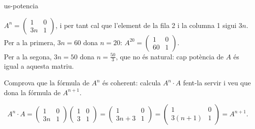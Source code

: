 \begin{apartats}
\begin{tria}{us-potencia}
\begin{solucio}
$A^n=\begin{pmatrix}1&0\\3n&1\end{pmatrix}$, i per tant cal que l'element de la fila 2 i la columna 1
sigui $3n$.\\
Per a la primera, $3n=60$ dona $n=20$: $A^{20}=\begin{pmatrix}1&0\\60&1\end{pmatrix}$.\\
Per a la segona, $3n=50$ dona $n=\frac{50}3$, que no és natural: cap potència de $A$ és igual a
aquesta matriu.
\end{solucio}
\end{tria}

\begin{nomesllarg}
Comprova que la fórmula de $A^n$ és coherent: calcula $A^n\cdot A$ fent-la servir i veu que dona la
fórmula de $A^{n+1}$.

\begin{solucio}
\[
A^n\cdot A=\begin{pmatrix}1&0\\3n&1\end{pmatrix}\begin{pmatrix}1&0\\3&1\end{pmatrix}
=\begin{pmatrix}1&0\\3n+3&1\end{pmatrix}=\begin{pmatrix}1&0\\3(n+1)&1\end{pmatrix}=A^{n+1}.
\]
\end{solucio}
\end{nomesllarg}

\end{apartats}
